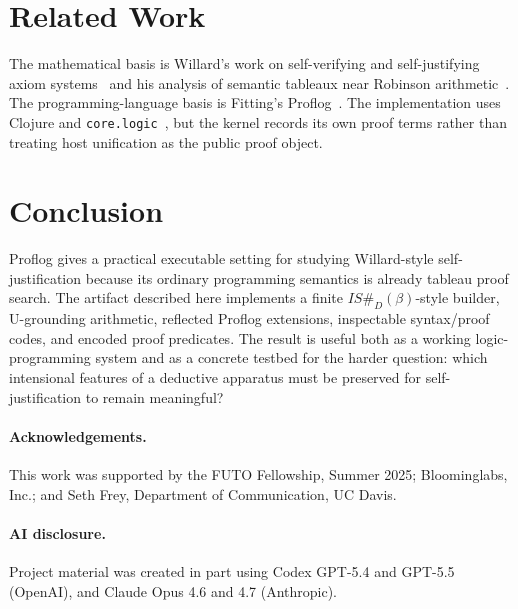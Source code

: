 \documentclass[runningheads]{llncs}
\begin{document}
\section{Related Work}

The mathematical basis is Willard's work on self-verifying and
self-justifying axiom systems~\cite{willard2001selfverifying,willard2011selfjustifying}
and his analysis of semantic tableaux near Robinson arithmetic~\cite{willard2004addition,willard2013significance}.
The programming-language basis is Fitting's Proflog~\cite{fitting1994tableaux}.
The implementation uses Clojure and \texttt{core.logic}~\cite{corelogic}, but
the kernel records its own proof terms rather than treating host unification as
the public proof object.

\section{Conclusion}

Proflog gives a practical executable setting for studying Willard-style
self-justification because its ordinary programming semantics is already
tableau proof search.  The artifact described here implements a finite
\(IS\#_D(\beta)\)-style builder, U-grounding arithmetic, reflected Proflog
extensions, inspectable syntax/proof codes, and encoded proof predicates.  The
result is useful both as a working logic-programming system and as a concrete
testbed for the harder question: which intensional features of a deductive
apparatus must be preserved for self-justification to remain meaningful?

\paragraph{Acknowledgements.}
This work was supported by the FUTO Fellowship, Summer 2025; Bloominglabs,
Inc.; and Seth Frey, Department of Communication, UC Davis.

\paragraph{AI disclosure.}
Project material was created in part using Codex GPT-5.4 and GPT-5.5
(OpenAI), and Claude Opus 4.6 and 4.7 (Anthropic).



\end{document}
